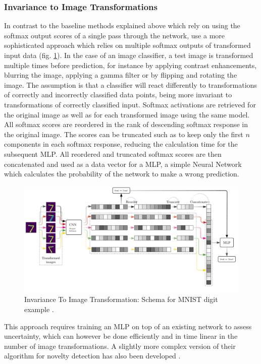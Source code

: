 \documentclass[10pt]{article}
\begin{document}
\subsubsection{Invariance to Image Transformations}
In contrast to the baseline methods explained above which rely on using the softmax output scores of a single pass through the network, \textcite{Bahat_2018} use a more sophisticated approach which relies on multiple softmax outputs of transformed input data (fig. \ref{fig:schema-baseline1}). In the case of an image classifier, a test image is transformed multiple times before prediction, for instance by applying contrast enhancements, blurring the image, applying a gamma filter or by flipping and rotating the image. The assumption is that a classifier will react differently to transformations of correctly and incorrectly classified data points, being more invariant to transformations of correctly classified input. Softmax activations are retrieved for the original image as well as for each transformed image using the same model. All softmax scores are reordered in the rank of descending softmax response in the original image. The scores can be truncated such as to keep only the first $n$ components in each softmax response, reducing the calculation time for the subsequent \gls{MLP}. All reordered and truncated softmax scores are then concatenated and used as a data vector for a \gls{MLP}, a simple Neural Network which calculates the probability of the network to make a wrong prediction.

\begin{figure}[H]
    \centering
    \includegraphics[width=\textwidth]{schema_baseline_1}
    \caption{Invariance To Image Transformation: Schema for MNIST digit example \cite{Bahat_2018}.}
    \label{fig:schema-baseline1}
\end{figure}

This approach requires training an \gls{MLP} on top of an existing network to assess uncertainty, which can however be done efficiently and in time linear in the number of image transformations. A slightly more complex version of their algorithm for novelty detection has also been developed \cite{Bahat_2018}.
\end{document}
